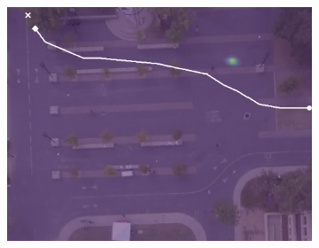 \documentclass[usenames,dvipsnames]{article}
\begin{document}
\begin{enumerate}
\begin{item}
\begin{figure}[t!]
\begin{subfigure}[t]{0.5\textwidth}
\begin{minipage}[c]{0.3\linewidth}
			\includegraphics[width=\linewidth]{./figures/bookstore/lstm_1_2_t=360.jpg}
		\end{minipage}
	

\end{subfigure}
\end{figure}
\end{item}
\end{enumerate}
\end{document}
